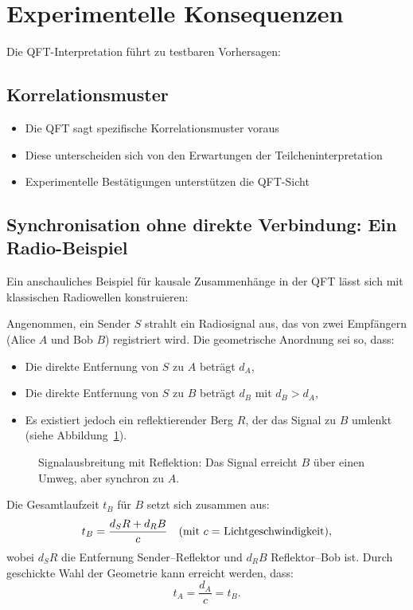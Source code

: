 \documentclass{article}
\begin{document}
	\section{Experimentelle Konsequenzen}  
	Die QFT-Interpretation führt zu testbaren Vorhersagen:  
	
	\subsection{Korrelationsmuster}  
	\begin{itemize}  
		\item Die QFT sagt spezifische Korrelationsmuster voraus  
		\item Diese unterscheiden sich von den Erwartungen der Teilcheninterpretation  
		\item Experimentelle Bestätigungen \cite{walborn2002} unterstützen die QFT-Sicht  
	\end{itemize}  
	
	\subsection{Synchronisation ohne direkte Verbindung: Ein Radio-Beispiel}  
	Ein anschauliches Beispiel für kausale Zusammenhänge in der QFT lässt sich mit klassischen Radiowellen konstruieren:  
	
	Angenommen, ein Sender \( S \) strahlt ein Radiosignal aus, das von zwei Empfängern (Alice \( A \) und Bob \( B \)) registriert wird. Die geometrische Anordnung sei so, dass:  
	\begin{itemize}  
		\item Die direkte Entfernung von \( S \) zu \( A \) beträgt \( d_A \),  
		\item Die direkte Entfernung von \( S \) zu \( B \) beträgt \( d_B \) mit \( d_B > d_A \),  
		\item Es existiert jedoch ein reflektierender Berg \( R \), der das Signal zu \( B \) umlenkt (siehe Abbildung~\ref{fig:radio}).  
	\end{itemize}  
	
	\begin{figure}[h]  
		\centering  
		\caption{Signalausbreitung mit Reflektion: Das Signal erreicht \( B \) über einen Umweg, aber synchron zu \( A \).}  
		\label{fig:radio}  
	\end{figure}  
	
	Die Gesamtlaufzeit \( t_B \) für \( B \) setzt sich zusammen aus:  
	\begin{equation}  
		t_B = \frac{d_SR + d_RB}{c} \quad \text{(mit \( c = \) Lichtgeschwindigkeit)},  
	\end{equation}  
	wobei \( d_SR \) die Entfernung Sender–Reflektor und \( d_RB \) Reflektor–Bob ist. Durch geschickte Wahl der Geometrie kann erreicht werden, dass:  
	\begin{equation}  
		t_A = \frac{d_A}{c} = t_B.  
	\end{equation}  
	
\end{document}
